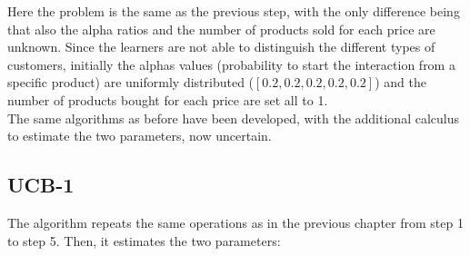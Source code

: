 Here the problem is the same as the previous step, with the only difference being that also the alpha ratios and the number of products sold for each price are unknown.
Since the learners are not able to distinguish the different types of customers, initially the alphas values (probability to start the interaction from a specific product) are uniformly distributed ($[0.2, 0.2, 0.2, 0.2, 0.2]$) and the number of products bought for each price are set all to 1.\\
The same algorithms as before have been developed, with the additional calculus to estimate the two parameters, now uncertain.

\subsection{UCB-1}
The algorithm repeats the same operations as in the previous chapter from step 1 to step 5. Then, it estimates the two parameters:

